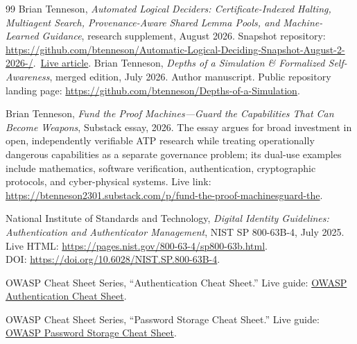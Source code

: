\documentclass[11pt,openany]{book}
\theoremstyle{definition}
\theoremstyle{remark}
\begin{document}
\begin{thebibliography}{99}
Brian Tenneson,
\emph{Automated Logical Deciders: Certificate-Indexed Halting, Multiagent Search, Provenance-Aware Shared Lemma Pools, and Machine-Learned Guidance}, research supplement, August 2026.
Snapshot repository: \href{https://github.com/btenneson/Automatic-Logical-Deciding-Snapshot-August-2-2026-}{https://github.com/btenneson/Automatic-Logical-Deciding-Snapshot-August-2-2026-/}.\ \href{https://btenneson.github.io/pub/papers/ald_certificate_halting_shared_lemma_pools/}{Live article}.
Brian Tenneson,
\emph{Depths of a Simulation \& Formalized Self-Awareness}, merged edition, July 2026. Author manuscript. Public repository landing page: \href{https://github.com/btenneson/Depths-of-a-Simulation}{https://github.com/btenneson/Depths-of-a-Simulation}.



Brian Tenneson,
\emph{Fund the Proof Machines---Guard the Capabilities That Can Become Weapons}, Substack essay, 2026. The essay argues for broad investment in open, independently verifiable ATP research while treating operationally dangerous capabilities as a separate governance problem; its dual-use examples include mathematics, software verification, authentication, cryptographic protocols, and cyber-physical systems.
Live link: \href{https://btenneson2301.substack.com/p/fund-the-proof-machinesguard-the}{https://btenneson2301.substack.com/p/fund-the-proof-machinesguard-the}.

National Institute of Standards and Technology,
\emph{Digital Identity Guidelines: Authentication and Authenticator Management}, NIST SP 800-63B-4, July 2025.
Live HTML: \href{https://pages.nist.gov/800-63-4/sp800-63b.html}{https://pages.nist.gov/800-63-4/sp800-63b.html}.\\
DOI: \href{https://doi.org/10.6028/NIST.SP.800-63B-4}{https://doi.org/10.6028/NIST.SP.800-63B-4}.

OWASP Cheat Sheet Series,
``Authentication Cheat Sheet.''
Live guide: \href{https://cheatsheetseries.owasp.org/cheatsheets/Authentication_Cheat_Sheet.html}{OWASP Authentication Cheat Sheet}.

OWASP Cheat Sheet Series,
``Password Storage Cheat Sheet.''
Live guide: \href{https://cheatsheetseries.owasp.org/cheatsheets/Password_Storage_Cheat_Sheet.html}{OWASP Password Storage Cheat Sheet}.




\end{thebibliography}
\end{document}
